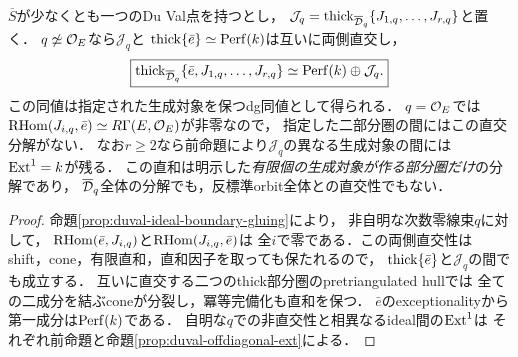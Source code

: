 \begin{corollary}[非自明パラメータでの有限生成部分圏の分離]
\label{cor:duval-local-splitting}
$\overline S$が少なくとも一つのDu Val点を持つとし，
$\mathcal J_q=\operatorname{thick}_{\overline{\mathcal D}_q}
 \{J_{1,q},\ldots,J_{r,q}\}$と置く．
$q\not\simeq\mathcal O_E$なら$\mathcal J_q$と
$\operatorname{thick}\{\bar e\}\simeq\operatorname{Perf}(k)$は互いに両側直交し，
\[
 \boxed{\operatorname{thick}_{\overline{\mathcal D}_q}
  \{\bar e,J_{1,q},\ldots,J_{r,q}\}
 \simeq \operatorname{Perf}(k)\oplus\mathcal J_q.}
\]
この同値は指定された生成対象を保つdg同値として得られる．
$q=\mathcal O_E$では$\operatorname{RHom}(J_{i,q},\bar e)\simeq
R\Gamma(E,\mathcal O_E)$が非零なので，
指定した二部分圏の間にはこの直交分解がない．
なお$r\ge2$なら前命題により$\mathcal J_q$の異なる生成対象の間には
$\operatorname{Ext}^1=k$が残る．
この直和は明示した\emph{有限個の生成対象が作る部分圏だけ}の分解であり，
$\overline{\mathcal D}_q$全体の分解でも，反標準orbit全体との直交性でもない．
\end{corollary}
\begin{proof}
命題\ref{prop:duval-ideal-boundary-gluing}により，
非自明な次数零線束$q$に対して，
$\operatorname{RHom}(\bar e,J_{i,q})$と$\operatorname{RHom}(J_{i,q},\bar e)$は
全$i$で零である．この両側直交性は
shift，cone，有限直和，直和因子を取っても保たれるので，
$\operatorname{thick}\{\bar e\}$と$\mathcal J_q$の間でも成立する．
互いに直交する二つのthick部分圏のpretriangulated hullでは
全ての二成分を結ぶconeが分裂し，冪等完備化も直和を保つ．
$\bar e$のexceptionalityから第一成分は$\operatorname{Perf}(k)$である．
自明な$q$での非直交性と相異なるideal間の$\operatorname{Ext}^1$は
それぞれ前命題と命題\ref{prop:duval-offdiagonal-ext}による．
\end{proof}


